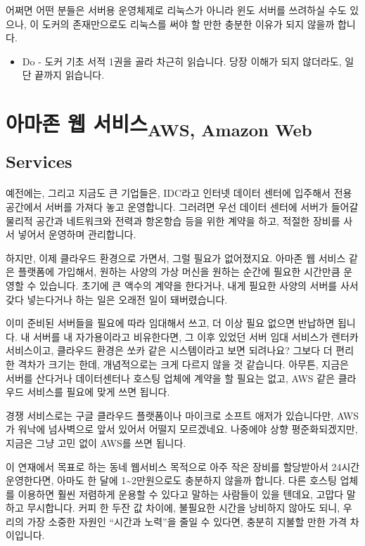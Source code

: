 \documentclass[11pt,a4paper]{article}
\newcommand{\sub}[1]{\textsubscript{#1}}
\begin{document}
어쩌면 어떤 분들은 서버용 운영체제로 리눅스가 아니라 윈도 서버를 쓰려하실 수도 있으나, 이 도커의 존재만으로도 리눅스를 써야 할 만한 충분한 이유가 되지 않을까 합니다.

\begin{itemize}
\item{Do} - 도커 기초 서적 1권을 골라 차근히 읽습니다. 당장 이해가 되지 않더라도, 일단 끝까지 읽습니다.
\end{itemize}

\section[AWS]{아마존 웹 서비스\sub{AWS, Amazon Web Services}}

예전에는, 그리고 지금도 큰 기업들은, IDC라고 인터넷 데이터 센터에 입주해서 전용 공간에서 서버를 가져다 놓고 운영합니다. 그러려면 우선 데이터 센터에 서버가 들어갈 물리적 공간과 네트워크와 전력과 항온항습 등을 위한 계약을 하고, 적절한 장비를 사서 넣어서 운영하며 관리합니다.

하지만, 이제 클라우드 환경으로 가면서, 그럴 필요가 없어졌지요. 아마존 웹 서비스 같은 플랫폼에 가입해서, 원하는 사양의 가상 머신을 원하는 순간에 필요한 시간만큼 운영할 수 있습니다. 초기에 큰 액수의 계약을 한다거나, 내게 필요한 사양의 서버를 사서 갖다 넣는다거나 하는 일은 오래전 일이 돼버렸습니다.

이미 준비된 서버들을 필요에 따라 임대해서 쓰고, 더 이상 필요 없으면 반납하면 됩니다. 내 서버를 내 자가용이라고 비유한다면, 그 이후 있었던 서버 임대 서비스가 렌터카 서비스이고, 클라우드 환경은 쏘카 같은 시스템이라고 보면 되려나요? 그보다 더 편리한 격차가 크기는 한데, 개념적으로는 크게 다르지 않을 것 같습니다. 아무튼, 지금은 서버를 산다거나 데이터센터나 호스팅 업체에 계약을 할 필요는 없고, AWS 같은 클라우드 서비스를 필요에 맞게 쓰면 됩니다.

경쟁 서비스로는 구글 클라우드 플랫폼이나 마이크로 소프트 애저가 있습니다만, AWS가 워낙에 넘사벽으로 앞서 있어서 어떨지 모르겠네요. 나중에야 상향 평준화되겠지만, 지금은 그냥 고민 없이 AWS를 쓰면 됩니다.

이 연재에서 목표로 하는 동네 웹서비스 목적으로 아주 작은 장비를 할당받아서 24시간 운영한다면, 아마도 한 달에 1\textasciitilde2만원으로도 충분하지 않을까 합니다. 다른 호스팅 업체를 이용하면 훨씬 저렴하게 운용할 수 있다고 말하는 사람들이 있을 텐데요, 고맙다 말하고 무시합니다. 커피 한 두잔 값 차이에, 불필요한 시간을 낭비하지 않아도 되니, 우리의 가장 소중한 자원인 ``시간과 노력''을 줄일 수 있다면, 충분히 지불할 만한 가격 차이입니다.
\end{document}
